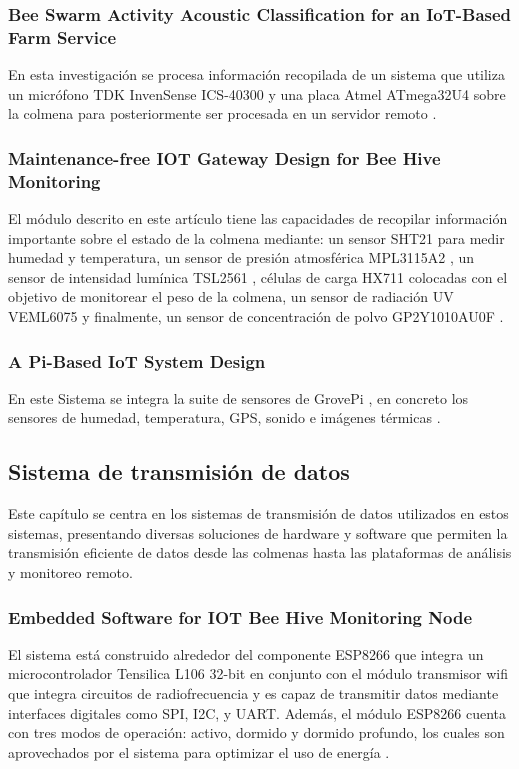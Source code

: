 \documentclass[journal]{IEEEtran} %
\begin{document}
\subsubsection{Bee Swarm Activity Acoustic Classification for an IoT-Based Farm Service}
En esta investigación se procesa información recopilada de un sistema que utiliza un micrófono TDK InvenSense ICS-40300 y una placa Atmel ATmega32U4 sobre la colmena para posteriormente ser procesada en un servidor remoto \cite{Zgank2019BeeService}.
\subsubsection{Maintenance-free IOT Gateway Design for Bee Hive Monitoring}
El módulo descrito en este artículo tiene las capacidades de recopilar información importante sobre el estado de la colmena mediante: un sensor SHT21 para medir humedad y temperatura, un sensor de presión atmosférica MPL3115A2 \cite{NXPBVMPL3115A2Sheet}, un sensor de intensidad lumínica TSL2561 \cite{OverviewSystem}, células de carga HX711 colocadas con el objetivo de monitorear el peso de la colmena, un sensor de radiación UV VEML6075 \cite{AdafruitKits} y finalmente, un sensor de concentración de polvo GP2Y1010AU0F \cite{SensorGP2Y1010AU0F} \cite{Vidrascu2017Maintenance-freeMonitoring}.
\subsubsection{A Pi-Based IoT System Design}
En este Sistema se integra la suite de sensores de GrovePi \cite{GrovePiKit}, en concreto los sensores de humedad, temperatura, GPS, sonido e imágenes térmicas \cite{Chen2020ADesign}.
\subsection{Sistema de transmisión de datos}
Este capítulo se centra en los sistemas de transmisión de datos utilizados en estos sistemas, presentando diversas soluciones de hardware y software que permiten la transmisión eficiente de datos desde las colmenas hasta las plataformas de análisis y monitoreo remoto.
\subsubsection{Embedded Software for IOT Bee Hive Monitoring Node}
El sistema está construido alrededor del componente ESP8266 que integra un microcontrolador Tensilica L106 32-bit en conjunto con el módulo transmisor wifi que integra circuitos de radiofrecuencia y es capaz de transmitir datos mediante interfaces digitales como SPI, I2C, y UART. Además, el módulo ESP8266 cuenta con tres modos de operación: activo, dormido y dormido profundo, los cuales son aprovechados por el sistema para optimizar el uso de energía \cite{Vidrascu2017EmbeddedNode}.
\end{document}

